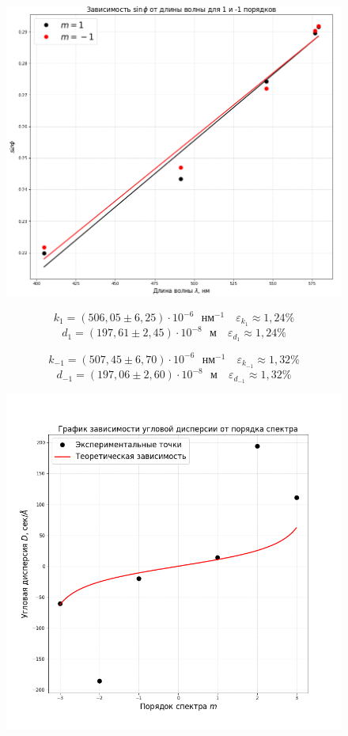 \documentclass[a4paper,12pt]{article}
\begin{document}
\newpage
\begin{figure}[H]\label{fig: sin_phi(lambd)}
    \centering
    \includegraphics[width = \textwidth]{sin_phi(lambd).png}
\end{figure}
\[k_1 = (506,05 \pm 6,25)\cdot 10^{-6}\text{ }нм^{-1} \quad \varepsilon_{k_1} \approx 1,24\%\]
\[d_1 = (197,61 \pm 2,45)\cdot 10^{-8}\text{ }м \quad \varepsilon_{d_1} \approx 1,24\%\]


\[k_{-1} = (507,45 \pm 6,70)\cdot 10^{-6}\text{ }нм^{-1} \quad \varepsilon_{k_{-1}} \approx 1,32\%\]
\[d_{-1} = (197,06 \pm 2,60)\cdot 10^{-8}\text{ }м \quad \varepsilon_{d_{-1}} \approx 1,32\%\]



\newpage
\begin{figure}[H]\label{fig: D(m)}
    \centering
    \includegraphics[width = \textwidth]{D(m).png}
\end{figure}


\end{document}

